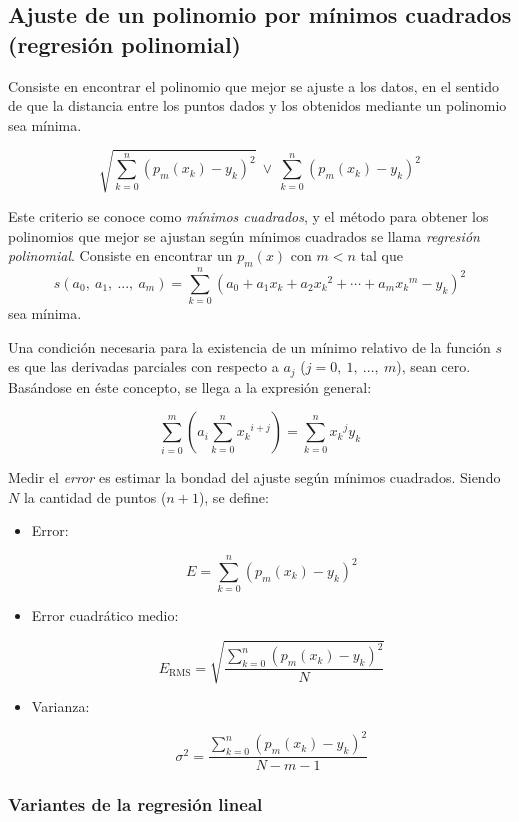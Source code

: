 \documentclass{article}
\begin{document}
\subsection{Ajuste de un polinomio por mínimos cuadrados (regresión polinomial)}

Consiste en encontrar el polinomio que mejor se ajuste a los datos, en el 
sentido de que la distancia entre los puntos dados y los obtenidos mediante un
polinomio sea mínima.

\begin{equation*}
    \sqrt{ \sum_{k=0}^{n} \left(p_m(x_k) - {y_k}\right)^2 }\ \lor\ 
    \sum_{k=0}^{n} \left(p_m(x_k) - {y_k}\right)^2
\end{equation*}

Este criterio se conoce como \emph{mínimos cuadrados}, y el método para obtener 
los polinomios que mejor se ajustan según mínimos cuadrados se llama 
\emph{regresión polinomial}. Consiste en encontrar un $p_m(x)$ con $m<n$ tal que
\[
s(a_0,\ a_1,\ ...,\ a_m) = \sum_{k=0}^{n} \left(a_0 + a_1x_k + a_2{x_k}^2 + 
\cdots + a_m{x_k}^m - y_k\right)^2
\]
sea mínima.

Una condición necesaria para la existencia de un mínimo relativo de la función 
$s$ es que las derivadas parciales con respecto a $a_j$ ($j=0,\ 1,\ ...,\ m$), 
sean cero. Basándose en éste concepto, se llega a la expresión general:

\[
\sum_{i=0}^{m} \left( a_i \sum_{k=0}^{n} {x_k}^{i+j} \right) 
= \sum_{k=0}^{n} {x_k}^jy_k
\]

Medir el \emph{error} es estimar la bondad del ajuste según mínimos cuadrados.
Siendo $N$ la cantidad de puntos ($n+1$), se define:

\begin{itemize}
    \item Error: 
    
    \[E = \sum_{k=0}^{n} \left(p_m(x_k) - {y_k}\right)^2\]

    \item Error cuadrático medio:

    \[E_{\text{RMS}} = 
    \sqrt{\frac{\sum_{k=0}^{n} \left(p_m(x_k) - {y_k}\right)^2}{N}} \]

    \item Varianza:

    \[ \sigma^2 = \frac{\sum_{k=0}^{n} \left(p_m(x_k) - {y_k}\right)^2}{N-m-1}\]
\end{itemize}

\subsubsection{Variantes de la regresión lineal}
\end{document}

